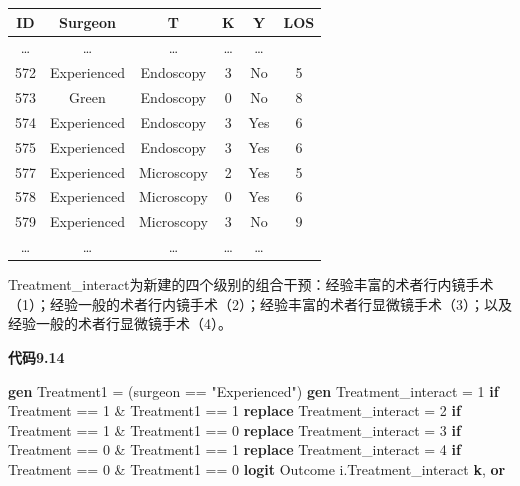 \documentclass[
  chinese-hans,
  letterpaper,
  DIV=11,
  numbers=noendperiod]{scrreprt}
\newenvironment{Shaded}{\begin{snugshade}}{\end{snugshade}}
\newcommand{\KeywordTok}[1]{\textcolor[rgb]{0.00,0.23,0.31}{\textbf{#1}}}
\newcommand{\NormalTok}[1]{\textcolor[rgb]{0.00,0.23,0.31}{#1}}
\newcommand{\StringTok}[1]{\textcolor[rgb]{0.13,0.47,0.30}{#1}}
\newcounter{none} %
\begin{document}
{\def\LTcaptype{none} %
\begin{longtable}[]{@{}cccccc@{}}
\toprule\noalign{}
ID & Surgeon & T & K & Y & LOS \\
\midrule\noalign{}
\endhead
\bottomrule\noalign{}
\endlastfoot
\ldots{} & \ldots{} & \ldots{} & \ldots{} & \ldots{} & \\
572 & Experienced & Endoscopy & 3 & No & 5 \\
573 & Green & Endoscopy & 0 & No & 8 \\
574 & Experienced & Endoscopy & 3 & Yes & 6 \\
575 & Experienced & Endoscopy & 3 & Yes & 6 \\
577 & Experienced & Microscopy & 2 & Yes & 5 \\
578 & Experienced & Microscopy & 0 & Yes & 6 \\
579 & Experienced & Microscopy & 3 & No & 9 \\
\ldots{} & \ldots{} & \ldots{} & \ldots{} & \ldots{} & \\
\end{longtable}
}

Treatment\_interact为新建的四个级别的组合干预：经验丰富的术者行内镜手术（1）；经验一般的术者行内镜手术（2）；经验丰富的术者行显微镜手术（3）；以及经验一般的术者行显微镜手术（4）。

\begin{tcolorbox}[enhanced jigsaw, arc=.35mm, bottomrule=.15mm, breakable, colback=white, colframe=quarto-callout-note-color-frame, left=2mm, leftrule=.75mm, opacityback=0, rightrule=.15mm, toprule=.15mm]

\vspace{-3mm}\textbf{代码9.14}\vspace{3mm}

\begin{Shaded}
\begin{Highlighting}[]
\KeywordTok{gen}\NormalTok{ Treatment1 = (surgeon == }\StringTok{"Experienced"}\NormalTok{)}
\KeywordTok{gen}\NormalTok{ Treatment\_interact = 1 }\KeywordTok{if}\NormalTok{ Treatment == 1 \& Treatment1 == 1}
\KeywordTok{replace}\NormalTok{ Treatment\_interact = 2 }\KeywordTok{if}\NormalTok{ Treatment == 1 \& Treatment1 == 0}
\KeywordTok{replace}\NormalTok{ Treatment\_interact = 3 }\KeywordTok{if}\NormalTok{ Treatment == 0 \& Treatment1 == 1}
\KeywordTok{replace}\NormalTok{ Treatment\_interact = 4 }\KeywordTok{if}\NormalTok{ Treatment == 0 \& Treatment1 == 0}
\KeywordTok{logit}\NormalTok{ Outcome i.Treatment\_interact }\KeywordTok{k}\NormalTok{, }\KeywordTok{or}
\end{Highlighting}
\end{Shaded}

\end{tcolorbox}
\end{document}
